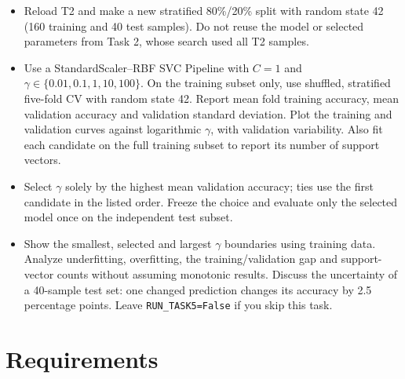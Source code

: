 \documentclass[12pt,a4paper]{article}
\begin{document}
\begin{itemize}
  \item Reload T2 and make a new stratified 80\%/20\% split with random state 42
        (160 training and 40 test samples). Do not reuse the model or selected
        parameters from Task 2, whose search used all T2 samples.

  \item Use a StandardScaler--RBF SVC Pipeline with $C=1$ and
        $\gamma\in\{0.01,0.1,1,10,100\}$. On the training subset only, use
        shuffled, stratified five-fold CV with random state 42. Report mean fold
        training accuracy, mean validation accuracy and validation standard
        deviation. Plot the training and validation curves against logarithmic
        $\gamma$, with validation variability. Also fit each candidate on the
        full training subset to report its number of support vectors.

  \item Select $\gamma$ solely by the highest mean validation accuracy; ties use
        the first candidate in the listed order. Freeze the choice and evaluate
        only the selected model once on the independent test subset.

  \item Show the smallest, selected and largest $\gamma$ boundaries using
        training data. Analyze underfitting, overfitting, the training/validation
        gap and support-vector counts without assuming monotonic results.
        Discuss the uncertainty of a 40-sample test set: one changed prediction
        changes its accuracy by 2.5 percentage points. Leave
        \texttt{RUN\_TASK5=False} if you skip this task.
\end{itemize}

\section{Requirements}
\end{document}

